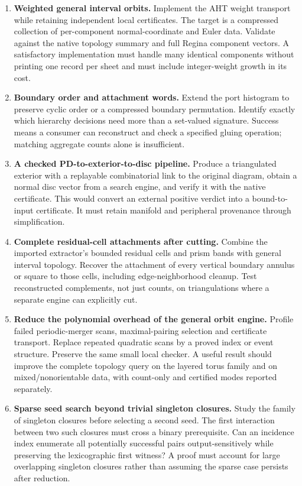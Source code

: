 \documentclass[11pt,a4paper]{article}
\theoremstyle{definition}\newtheorem{definition}[theorem]{Definition}
\theoremstyle{remark}\newtheorem{remark}[theorem]{Remark}
\begin{document}
\begin{enumerate}[label=\textbf{\arabic*.},itemsep=6pt]
\item \textbf{Weighted general interval orbits.}
Implement the AHT weight transport while retaining independent local
certificates. The target is a compressed collection of per-component
normal-coordinate and Euler data. Validate against the native topology
summary and full Regina component vectors. A satisfactory implementation
must handle many identical components without printing one record per
sheet and must include integer-weight growth in its cost.

\item \textbf{Boundary order and attachment words.}
Extend the port histogram to preserve cyclic order or a compressed
boundary permutation. Identify exactly which hierarchy decisions need
more than a set-valued signature. Success means a consumer can reconstruct
and check a specified gluing operation; matching aggregate counts alone
is insufficient.

\item \textbf{A checked PD-to-exterior-to-disc pipeline.}
Produce a triangulated exterior with a replayable combinatorial link to
the original diagram, obtain a normal disc vector from a search engine,
and verify it with the native certificate. This would convert an external
positive verdict into a bound-to-input certificate. It must retain
manifold and peripheral provenance through simplification.

\item \textbf{Complete residual-cell attachments after cutting.}
Combine the imported extractor's bounded residual cells and prism bands
with general interval topology. Recover the attachment of every vertical
boundary annulus or square to those cells, including edge-neighborhood
cleanup. Test reconstructed complements, not just counts, on triangulations
where a separate engine can explicitly cut.

\item \textbf{Reduce the polynomial overhead of the general orbit engine.}
Profile failed periodic-merger scans, maximal-pairing selection and
certificate transport. Replace repeated quadratic scans by a proved
index or event structure. Preserve the same small local checker. A useful
result should improve the complete topology query on the layered torus
family and on mixed/nonorientable data, with count-only and certified
modes reported separately.

\item \textbf{Sparse seed search beyond trivial singleton closures.}
Study the family of singleton closures before selecting a second seed.
The first interaction between two such closures must cross a binary
prerequisite. Can an incidence index enumerate all potentially successful
pairs output-sensitively while preserving the lexicographic first witness?
A proof must account for large overlapping singleton closures rather
than assuming the sparse case persists after reduction.


\end{enumerate}
\end{document}
